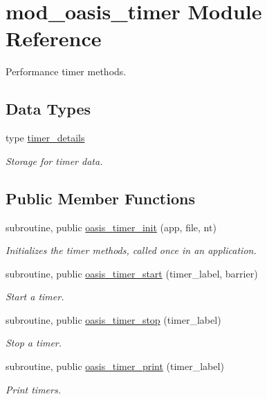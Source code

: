 \hypertarget{classmod__oasis__timer}{\section{mod\+\_\+oasis\+\_\+timer Module Reference}
\label{classmod__oasis__timer}
}


Performance timer methods.  


\subsection*{Data Types}
\begin{DoxyCompactItemize}
\item 
type \hyperlink{structmod__oasis__timer_1_1timer__details}{timer\+\_\+details}
\begin{DoxyCompactList}\small\item\em Storage for timer data. \end{DoxyCompactList}\end{DoxyCompactItemize}
\subsection*{Public Member Functions}
\begin{DoxyCompactItemize}
\item 
subroutine, public \hyperlink{classmod__oasis__timer_a44a1bb64d1d892a9710d8c94d0ed0e3a}{oasis\+\_\+timer\+\_\+init} (app, file, nt)
\begin{DoxyCompactList}\small\item\em Initializes the timer methods, called once in an application. \end{DoxyCompactList}\item 
subroutine, public \hyperlink{classmod__oasis__timer_a13a16c07778911b45f3f42a542348019}{oasis\+\_\+timer\+\_\+start} (timer\+\_\+label, barrier)
\begin{DoxyCompactList}\small\item\em Start a timer. \end{DoxyCompactList}\item 
subroutine, public \hyperlink{classmod__oasis__timer_a01a76142a72cc6bc845736e79ad99bd3}{oasis\+\_\+timer\+\_\+stop} (timer\+\_\+label)
\begin{DoxyCompactList}\small\item\em Stop a timer. \end{DoxyCompactList}\item 
subroutine, public \hyperlink{classmod__oasis__timer_a3071ad54f61d88f16ad98ad7c0303915}{oasis\+\_\+timer\+\_\+print} (timer\+\_\+label)
\begin{DoxyCompactList}\small\item\em Print timers. \end{DoxyCompactList}\end{DoxyCompactItemize}
